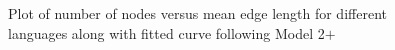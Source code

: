 \documentclass[a4paper]{article}
\begin{document}
\begin{figure}[hbtp]
	\centering
	\quad
	\caption{Plot of number of nodes versus mean edge length for different languages along with fitted curve following Model 2$+$}
	
\end{figure}
\end{document}
